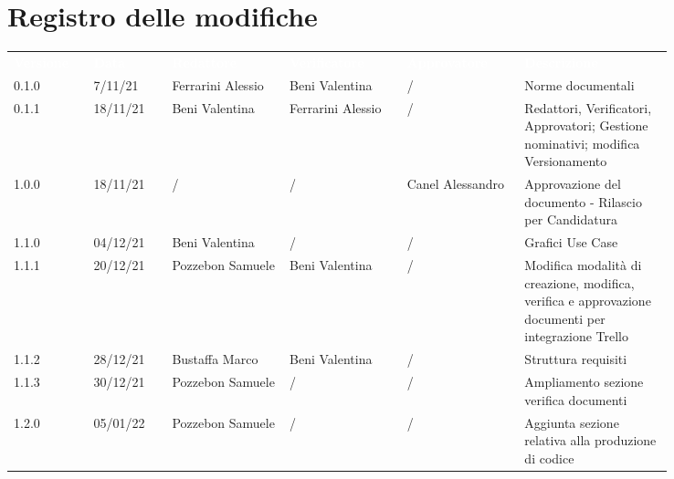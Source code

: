 \section*{Registro delle modifiche}

{\renewcommand{\arraystretch}{1.5}
\scriptsize
\begin{tabular}{p{0.10\linewidth}p{0.10\linewidth}p{0.15\linewidth}p{0.15\linewidth}p{0.15\linewidth}p{0.19\linewidth}}
	\rowcolor[RGB]{33, 73, 50}
	\textcolor{white}{\textbf{Versione}} & \textcolor{white}{\textbf{Data}} & \textcolor{white}
	{\textbf{Redattore}} & \textcolor{white}{\textbf{Verificatore}} & \textcolor{white}{\textbf{Approvatore}} & \textcolor{white}
	{\textbf{Descrizione}}\\
	\rowcolor[RGB]{216, 235, 171}
	0.1.0 & 7/11/21 & Ferrarini Alessio & Beni Valentina & / & Norme documentali\\
	\rowcolor[RGB]{233, 245, 206}
	0.1.1 & 18/11/21 & Beni Valentina & Ferrarini Alessio & / & Redattori, Verificatori, Approvatori; Gestione nominativi; modifica Versionamento\\
	\rowcolor[RGB]{216, 235, 171}
	1.0.0 & 18/11/21 & / & / & Canel Alessandro & Approvazione del documento - Rilascio per Candidatura\\
	\rowcolor[RGB]{233, 245, 206}
	1.1.0 & 04/12/21 & Beni Valentina & / & / & Grafici Use Case \\
	\rowcolor[RGB]{216, 235, 171}
	1.1.1 & 20/12/21 & Pozzebon Samuele & Beni Valentina & / & Modifica modalità di	creazione, modifica, verifica e approvazione documenti per integrazione Trello\\
	\rowcolor[RGB]{233, 245, 206}
	1.1.2 & 28/12/21 & Bustaffa Marco & Beni Valentina & / & Struttura requisiti\\
	\rowcolor[RGB]{216, 235, 171}
	1.1.3 & 30/12/21 & Pozzebon Samuele & / & / & Ampliamento sezione verifica documenti\\
	\rowcolor[RGB]{233, 245, 206}
	1.2.0 & 05/01/22 & Pozzebon Samuele & / & / & Aggiunta sezione relativa alla produzione di codice\\
\end{tabular}
}